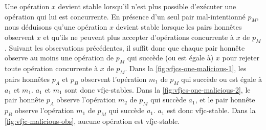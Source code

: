 Une opération $x$ devient stable lorsqu'il n'est plus possible d'exécuter une opération qui lui est concurrente.
En présence d'un seul pair mal-intentionné $p_M$, nous déduisons qu'une opération $x$ devient stable lorsque les pairs honnêtes observent $x$ et qu'ils ne peuvent plus accepter d'opérations concurrente à $x$ de $p_M$.
Suivant les observations précédentes, il suffit donc que chaque pair honnête observe au moins une opération de $p_M$ qui succède (ou est égale à) $x$ pour rejeter toute opération concurrente à $x$ de $p_M$.
Dans la \autoref{fig:vfjcs-one-malicious-1}, les pairs honnêtes $p_A$ et $p_B$ observent l'opération $m_1$ de $p_M$ qui succède ou est égale à $a_1$ et $m_1$.
$a_1$ et $m_1$ sont donc vfjc-stables.
Dans la \autoref{fig:vfjcs-one-malicious-2}, le pair honnête $p_A$ observe l'opération $m_2$ de $p_M$ qui succède $a_1$, et le pair honnête $p_B$ observe l'opération $m_1$ de $p_M$ qui succède $a_1$.
$a_1$ est donc vfjc-stable.
Dans la \autoref{fig:vfjc-malicious-obs}, aucune opération est vfjc-stable.

